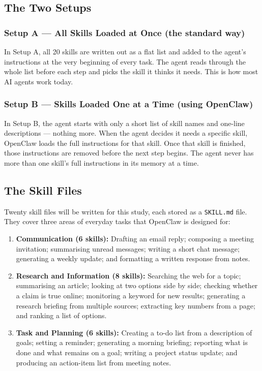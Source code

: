 \subsection{The Two Setups}

\subsubsection*{Setup A --- All Skills Loaded at Once (the standard way)}

In Setup A, all 20 skills are written out as a flat list and added to the agent's instructions at the very beginning of every task. The agent reads through the whole list before each step and picks the skill it thinks it needs. This is how most AI agents work today.

\subsubsection*{Setup B --- Skills Loaded One at a Time (using OpenClaw)}

In Setup B, the agent starts with only a short list of skill names and one-line descriptions --- nothing more. When the agent decides it needs a specific skill, OpenClaw loads the full instructions for that skill. Once that skill is finished, those instructions are removed before the next step begins. The agent never has more than one skill's full instructions in its memory at a time.

\subsection{The Skill Files}

Twenty skill files will be written for this study, each stored as a \texttt{SKILL.md} file. They cover three areas of everyday tasks that OpenClaw is designed for:

\begin{enumerate}
    \item \textbf{Communication (6 skills):} Drafting an email reply; composing a meeting invitation; summarising unread messages; writing a short chat message; generating a weekly update; and formatting a written response from notes.

    \item \textbf{Research and Information (8 skills):} Searching the web for a topic; summarising an article; looking at two options side by side; checking whether a claim is true online; monitoring a keyword for new results; generating a research briefing from multiple sources; extracting key numbers from a page; and ranking a list of options.

    \item \textbf{Task and Planning (6 skills):} Creating a to-do list from a description of goals; setting a reminder; generating a morning briefing; reporting what is done and what remains on a goal; writing a project status update; and producing an action-item list from meeting notes.
\end{enumerate}

